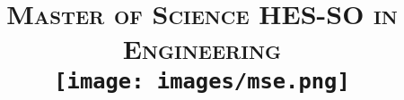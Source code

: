 
\usepackage{fancyhdr}

\pagestyle{fancy}

\lhead{\small\assignmentTitle\ }
\lfoot{}
\rfoot{}

\renewcommand\headrulewidth{0.5pt}


\usepackage{titlesec}

\titleformat{\section}{\Large\bfseries}{\thesection}{6pt}{}


\author{\textbf{\assignmentAuthorName}} %
\date{} %

\title{
    \textsc{\LARGE Master of Science HES-SO in Engineering}\\[1.5cm] %
    \texttt{[image: images/mse.png]}\\
    \thispagestyle{empty} %
    \vspace{0.1\textheight} %
    \textbf{\assignmentTitle}\\[4pt]
    \ifdef{\assignmentDueDate}{{\assignmentDueDate}\\}{} %
    \ifdef{\assignmentClassInstructor}{{\large \textit{\assignmentClassInstructor}}}{} %
    \vspace{0.32\textheight} %
}

